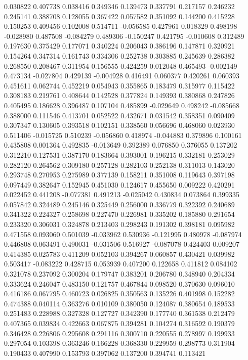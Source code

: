 0.030822
0.407738
0.038416
0.349346
0.139473
0.337791
0.217157
0.246232
0.245141
0.388708
0.128055
0.367422
0.057582
0.351092
0.144200
0.415228
0.150253
0.409456
0.102008
0.514711
-0.056585
0.427961
0.018329
0.498198
-0.028980
0.487508
-0.084279
0.489306
-0.150247
0.421795
-0.010608
0.312489
0.197630
0.375429
0.177071
0.340224
0.206043
0.386196
0.147871
0.320921
0.154264
0.347314
0.161743
0.334306
0.252738
0.303885
0.245639
0.286382
0.268550
0.208467
0.311954
0.156555
0.424259
0.012048
0.465493
-0.002149
0.473134
-0.027804
0.429139
-0.004928
0.416491
0.060377
0.420261
0.060393
0.451611
0.062744
0.452219
0.054943
0.355865
0.183479
0.315977
0.115422
0.308183
0.219761
0.408644
0.142528
0.377824
0.149393
0.380868
0.247826
0.405495
0.186628
0.396487
0.107104
0.485899
-0.029649
0.498242
-0.085668
0.388000
0.111546
0.413701
0.052522
0.432671
0.031542
0.358351
0.090409
0.307347
0.130605
0.393518
0.102151
0.338560
0.056696
0.468060
0.023930
0.511406
-0.015725
0.510239
-0.056860
0.418974
-0.044883
0.379896
0.100161
0.435808
0.001364
0.492835
-0.013649
0.392389
0.076850
0.376055
0.137202
0.312210
0.127531
0.387170
0.183664
0.393001
0.196215
0.332181
0.253029
0.282120
0.264562
0.309180
0.257128
0.282103
0.252138
0.311013
0.143020
0.293748
0.270953
0.275989
0.377139
0.158211
0.351008
0.119643
0.397198
0.097449
0.382647
0.152945
0.451030
0.124617
0.455650
0.009222
0.420291
0.022452
0.441208
-0.077381
0.491213
-0.025042
0.430834
0.073864
0.399335
0.057842
0.324489
0.245146
0.325449
0.256000
0.336779
0.322392
0.240689
0.341322
0.224327
0.258698
0.227470
0.226981
0.335202
0.185880
0.291654
0.233320
0.306031
0.324878
0.213403
0.298243
0.191302
0.398181
0.095982
0.471558
0.093060
0.501039
-0.033962
0.530936
-0.121995
0.480978
-0.087974
0.446808
0.063491
0.490031
-0.031506
0.516927
-0.087078
0.424403
0.009207
0.414385
0.025783
0.411209
0.052103
0.394267
0.060857
0.430421
0.039982
0.503417
-0.083222
0.428715
0.053939
0.407200
0.122658
0.411812
0.084102
0.321078
0.237092
0.300204
0.179747
0.383201
0.206780
0.348940
0.204334
0.333624
0.246047
0.483150
0.121757
0.467844
0.098520
0.370630
0.096010
0.416186
0.067795
0.460723
0.026825
0.350563
0.135226
0.401998
0.152282
0.474388
0.040114
0.363276
0.010109
0.380050
0.124087
0.380654
0.189533
0.251483
0.228988
0.327328
0.127727
0.342390
0.177740
0.361538
0.212479
0.407365
0.039834
0.422663
0.067875
0.394281
0.104274
0.316592
0.190379
0.346428
0.226806
0.295608
0.291116
0.300710
0.220555
0.278997
0.199933
0.297054
0.103398
0.363246
0.166228
0.368330
0.229959
0.298773
0.311904
0.190433
0.407990
0.153793
0.397062
0.137200
0.394741
0.113421
